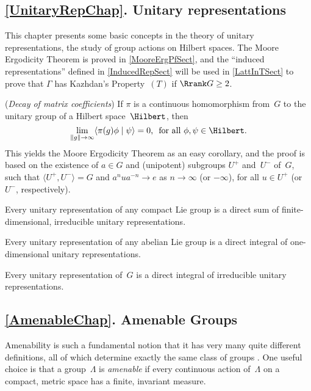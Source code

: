 \smallbreak

\subsection*{\cref{UnitaryRepChap}. Unitary representations}
This chapter presents some basic concepts in the theory of unitary representations, the study of group actions on Hilbert spaces. The Moore Ergodicity Theorem  is proved in \cref{MooreErgPfSect}, and the ``induced representations'' defined in \cref{InducedRepSect} will be used in \cref{LattInTSect} to prove that $\Gamma$ has Kazhdan's Property~$(T)$ if $\Rrank G \ge 2$.

\smallbreak

 (\emph{Decay of matrix coefficients}) If $\pi$ is a continuous homomorphism from~$G$ to the unitary group of a Hilbert space~$\Hilbert$, then 
	$$ \text{$\lim_{\|g\|\to \infty} \langle \pi(g) \phi \mid \psi \rangle = 0$, \ for all $\phi,\psi \in \Hilbert$} .$$
This yields the Moore Ergodicity Theorem  as an easy corollary, and the proof is based on the existence of $a \in G$ and (unipotent) subgroups $U^+$ and~$U^-$ of~$G$, such that $\langle U^+, U^-\rangle = G$ and $a^n u a^{-n} \to e$ as $n \to \infty$ (or $-\infty$), for all $u \in U^+$ (or $U^-$, respectively). 

\smallbreak

Every unitary representation of any compact Lie group is a direct sum of finite-dimensional, irreducible unitary representations.

 \smallbreak

Every unitary representation of any abelian Lie group is a direct integral of one-dimensional unitary representations.

 \smallbreak

Every unitary representation of~$G$ is a direct integral of irreducible unitary representations.




\subsection*{\cref{AmenableChap}. Amenable Groups}
Amenability is such a fundamental notion that it has very many quite different definitions, all of which determine exactly the same class of groups . One useful choice is that a group~$\Lambda$ is \emph{amenable} if every continuous action of~$\Lambda$ on a compact, metric space has a finite, invariant measure. 

